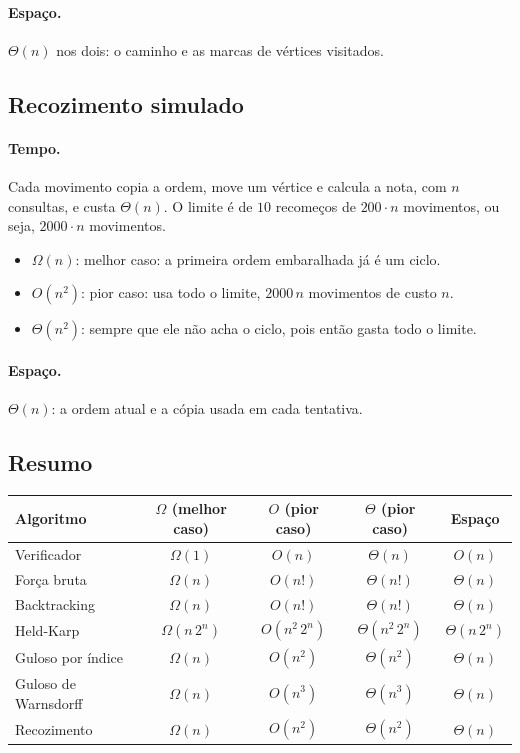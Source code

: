 \documentclass[12pt,a4paper]{article}
\begin{document}
\paragraph{Espaço.} $\Theta(n)$ nos dois: o caminho e as marcas de vértices visitados.

\subsection{Recozimento simulado}

\paragraph{Tempo.} Cada movimento copia a ordem, move um vértice e calcula a nota, com $n$ consultas, e custa $\Theta(n)$. O limite é de $10$ recomeços de $200\cdot n$ movimentos, ou seja, $2000\cdot n$ movimentos.
\begin{itemize}
  \item $\Omega(n)$: melhor caso: a primeira ordem embaralhada já é um ciclo.
  \item $O(n^2)$: pior caso: usa todo o limite, $2000\,n$ movimentos de custo $n$.
  \item $\Theta(n^2)$: sempre que ele não acha o ciclo, pois então gasta todo o limite.
\end{itemize}

\paragraph{Espaço.} $\Theta(n)$: a ordem atual e a cópia usada em cada tentativa.

\subsection{Resumo}

\begin{center}
\small
\begin{tabular}{p{3.2cm} c c c c}
\toprule
Algoritmo & $\Omega$ (melhor caso) & $O$ (pior caso) & $\Theta$ (pior caso) & Espaço\\
\midrule
Verificador & $\Omega(1)$ & $O(n)$ & $\Theta(n)$ & $O(n)$\\
Força bruta & $\Omega(n)$ & $O(n!)$ & $\Theta(n!)$ & $\Theta(n)$\\
Backtracking & $\Omega(n)$ & $O(n!)$ & $\Theta(n!)$ & $\Theta(n)$\\
Held-Karp & $\Omega(n\,2^n)$ & $O(n^2\,2^n)$ & $\Theta(n^2\,2^n)$ & $\Theta(n\,2^n)$\\
Guloso por índice & $\Omega(n)$ & $O(n^2)$ & $\Theta(n^2)$ & $\Theta(n)$\\
Guloso de Warnsdorff & $\Omega(n)$ & $O(n^3)$ & $\Theta(n^3)$ & $\Theta(n)$\\
Recozimento & $\Omega(n)$ & $O(n^2)$ & $\Theta(n^2)$ & $\Theta(n)$\\
\bottomrule
\end{tabular}
\end{center}
\end{document}

